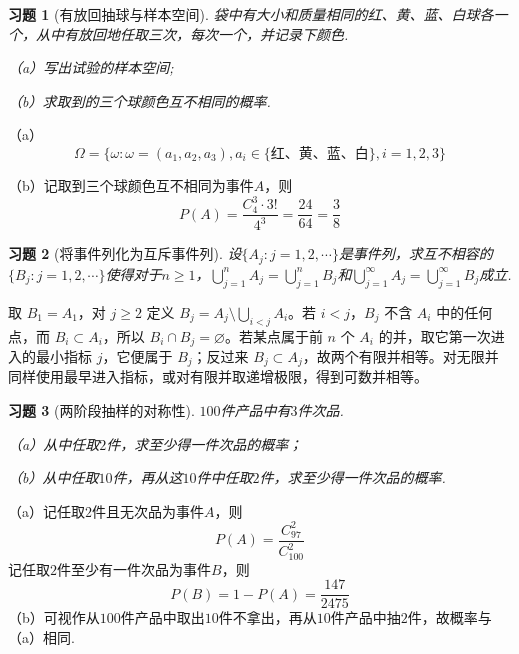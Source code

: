 \documentclass[UTF8,12pt,a4paper,fontset=fandol]{ctexart}
\newtheorem{exercise}{习题}[section]
\begin{document}
\begin{exercise}[有放回抽球与样本空间]\label{q:Y1.3}
袋中有大小和质量相同的红、黄、蓝、白球各一个，从中有放回地任取三次，每次一个，并记录下颜色.

（a）写出试验的样本空间;

（b）求取到的三个球颜色互不相同的概率.\par{}
\end{exercise}

\begin{solve}\label{a:Y1.3}
（a）
\[\Omega  = \{ \omega :\omega  = ({a_1},{a_2},{a_3}),{a_i} \in \{\text{红、黄、蓝、白} \} ,i = 1,2,3\} \]

（b）记取到三个球颜色互不相同为事件$A$，则
\[P(A) = \frac{{C_4^3}\cdot 3!}{{{4^3}}} = \frac{{24}}{{64}} = \frac{3}{8}\]
\end{solve}

\begin{exercise}[将事件列化为互斥事件列]\label{q:Y1.4}
设$\{A_j:j=1,2,\cdots\}$是事件列，求互不相容的$\{B_j:j=1,2,\cdots\}$使得对于$n\geqslant 1$，$\bigcup\limits_{j = 1}^n {{A_j}}  = \bigcup\limits_{j = 1}^n {{B_j}} $和$\bigcup\limits_{j = 1}^\infty  {{A_j}}  = \bigcup\limits_{j = 1}^\infty  {{B_j}} $成立.\par{}
\end{exercise}

\begin{solve}\label{a:Y1.4}取 $B_1=A_1$，对 $j\ge2$ 定义 $B_j=A_j\setminus\bigcup_{i<j}A_i$。若 $i<j$，$B_j$ 不含 $A_i$ 中的任何点，而 $B_i\subset A_i$，所以 $B_i\cap B_j=\varnothing$。若某点属于前 $n$ 个 $A_i$ 的并，取它第一次进入的最小指标 $j$，它便属于 $B_j$；反过来 $B_j\subset A_j$，故两个有限并相等。对无限并同样使用最早进入指标，或对有限并取递增极限，得到可数并相等。\end{solve}

\begin{exercise}[两阶段抽样的对称性]\label{q:Y1.5}
$100$件产品中有$3$件次品.

（a）从中任取$2$件，求至少得一件次品的概率；

（b）从中任取$10$件，再从这$10$件中任取$2$件，求至少得一件次品的概率.\par{}
\end{exercise}

\begin{solve}\label{a:Y1.5}
（a）记任取$2$件且无次品为事件$A$，则
\[P(A) = \frac{{C_{97}^2}}{{C_{100}^2}} \]
记任取$2$件至少有一件次品为事件$B$，则
\[
P(B)=1-P(A)=\frac{147}{2475}
\]
（b）可视作从$100$件产品中取出$10$件不拿出，再从$10$件产品中抽$2$件，故概率与（a）相同.
\end{solve}
\end{document}
